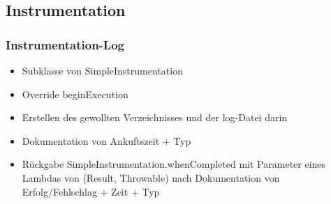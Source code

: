 \subsection*{Instrumentation}

\begin{frame}\frametitle{Instrumentation-Log}
    \begin{itemize} 
        \item Subklasse von \dq SimpleInstrumentation\dq{}
        \item Override \dq beginExecution\dq{} 
        \item Erstellen des gewollten Verzeichnisses und der log-Datei darin
        \item Dokumentation von Ankuftszeit + Typ
        \item Rückgabe SimpleInstrumentation.whenCompleted mit Parameter eines Lambdas 
              von \dq (Result, Throwable)\dq{} nach Dokumentation von Erfolg/Fehlschlag + Zeit + Typ
    \end{itemize}
\end{frame}
